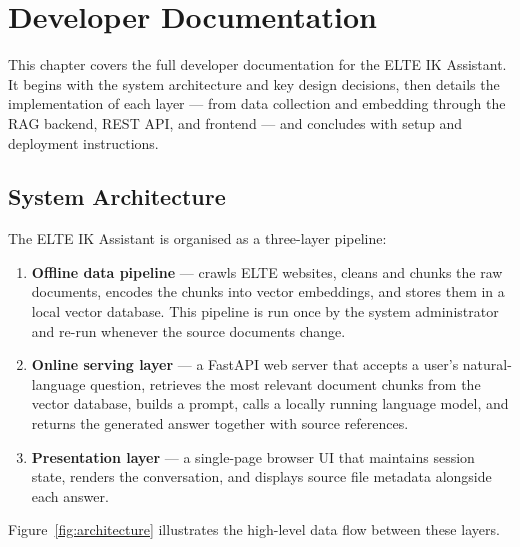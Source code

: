 \chapter{Developer Documentation}
\label{ch:devdocs}

This chapter covers the full developer documentation for the ELTE IK Assistant. It begins with the system architecture and key design decisions, then details the implementation of each layer — from data collection and embedding through the RAG backend, REST API, and frontend — and concludes with setup and deployment instructions.

\section{System Architecture}
\label{sec:design-overview}

The ELTE IK Assistant is organised as a three-layer pipeline:

\begin{enumerate}
    \item \textbf{Offline data pipeline} — crawls ELTE websites, cleans and chunks the raw documents, encodes the chunks into vector embeddings, and stores them in a local vector database. This pipeline is run once by the system administrator and re-run whenever the source documents change.
    \item \textbf{Online serving layer} — a FastAPI web server that accepts a user's natural-language question, retrieves the most relevant document chunks from the vector database, builds a prompt, calls a locally running language model, and returns the generated answer together with source references.
    \item \textbf{Presentation layer} — a single-page browser UI that maintains session state, renders the conversation, and displays source file metadata alongside each answer.
\end{enumerate}

Figure~\ref{fig:architecture} illustrates the high-level data flow between these layers.

